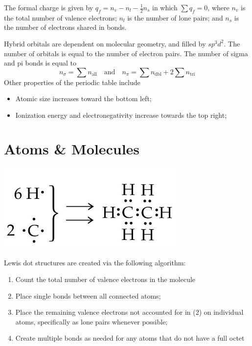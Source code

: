 \documentclass{tufte-book}
\begin{document}
The formal charge is given by $q_f = n_v - n_l - \frac{1}{2} n_s$ in which $\sum q_f = 0$, where $n_v$ is the total number of valence electrons; $n_l$ is the number of lone pairs; and $n_s$ is the number of electrons shared in bonds.

\bigskip
Hybrid orbitals are dependent on molecular geometry, and filled by $sp^3d^2$. The number of orbitals is equal to the number of electron pairs. The number of sigma and pi bonds is equal to \begin{equation}
  n_\sigma = \sum n_\text{all} \quad\text{and}\quad n_\pi = \sum n_\text{dbl} + 2 \sum n_\text{tri}
\end{equation}
Other properties of the periodic table include \begin{itemize}
  \item Atomic size increases toward the bottom left;
  \item Ionization energy and electronegativity increase towards the top right;
\end{itemize}
\section{Atoms \& Molecules}
\begin{marginfigure}[3cm]
\begin{center}
  \includegraphics[width=0.7\textwidth]{lewis} \phantom{mmmm}
\end{center}
\end{marginfigure}
Lewis dot structures are created via the following algorithm: \begin{enumerate}
  \item Count the total number of valence electrons in the molecule
  \item Place single bonds between all connected atoms;
  \item Place the remaining valence electrons not accounted for in (2) on individual atoms, specifically as lone pairs whenever possible;
  \item Create multiple bonds as needed for any atoms that do not have a full octet
\end{enumerate}
\end{document}
